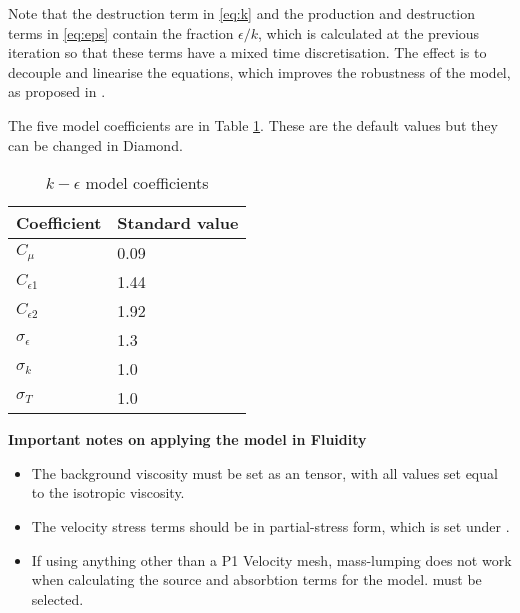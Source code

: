 Note that the destruction term in \ref{eq:k} and the production and destruction terms in
\ref{eq:eps} contain the fraction $\epsilon/k$, which is calculated at the previous
iteration so that these terms have a mixed time discretisation.  The effect is to decouple
and linearise the equations, which improves the robustness of the model, as proposed in
\cite{kuzmin2007}.



The five model coefficients are in Table \ref{tab:kepsco}. These are the default values
but they can be changed in Diamond.

\begin{table}[hb]
  \begin{center}
    \begin{tabular}{ll}\hline
      Coefficient & Standard value \\ \hline
      $C_\mu$ & 0.09 \\
      $C_{\epsilon1}$ & 1.44 \\
      $C_{\epsilon2}$ & 1.92 \\
      $\sigma_\epsilon$ & 1.3 \\
      $\sigma_k$ & 1.0 \\
      $\sigma_T$ & 1.0 \\ \hline
    \end{tabular}
  \end{center}
  \caption{$k-\epsilon$ model coefficients}
  \label{tab:kepsco}
\end{table}

\par{\textbf{Important notes on applying the model in Fluidity}}
\begin{itemize}
\item The background viscosity must be set as an  tensor,
  with all values set equal to the isotropic viscosity.
\item The velocity stress terms should be in partial-stress form, which is set under
  .
\item If using anything other than a P1 Velocity mesh, mass-lumping does not work when
  calculating the source and absorbtion terms for the
  model. 
  must be selected.
\end{itemize}

